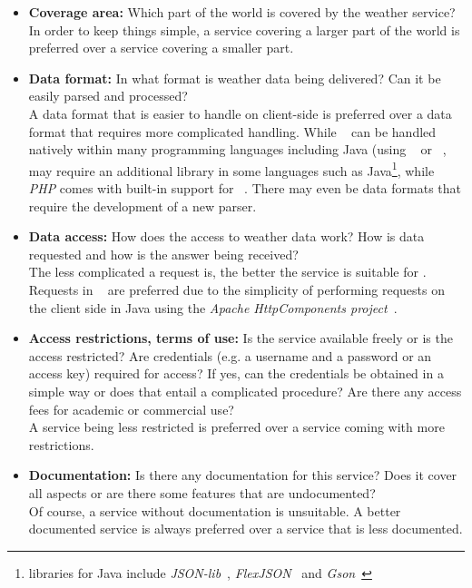 \begin{itemize}
  \item \textbf{Coverage area:} Which part of the world is covered by the weather service?\\
  In order to keep things simple, a service covering a larger part of the world is preferred over a service covering a smaller part.
  
  \item \textbf{Data format:} In what format is weather data being delivered? Can it be easily parsed and processed?\\
  A data format that is easier to handle on client-side is preferred over a data format that requires more complicated handling. While ~\cite{XML} can be handled natively within many programming languages including Java (using ~\cite{DOM} or ~\cite{SAX}, ~\cite{rfc4627} may require an additional library in some languages such as Java\footnote{ libraries for Java include \emph{JSON-lib}~\cite{json-lib}, \emph{FlexJSON}~\cite{flexjson} and \emph{Gson}~\cite{gson}}, while \emph{PHP} comes with built-in support for ~\cite{php-json}. There may even be data formats that require the development of a new parser.
  
  \item \textbf{Data access:} How does the access to weather data work? How is data requested and how is the answer being received?\\
  The less complicated a request is, the better the service is suitable for \smarthomeweather. Requests in ~\cite{rfc2616} are preferred due to the simplicity of performing requests on the client side in Java using the \emph{Apache HttpComponents project}~\cite{apache_hc}.
  
  \item \textbf{Access restrictions, terms of use:} Is the service available freely or is the access restricted? Are credentials (e.g. a username and a password or an access key) required for access? If yes, can the credentials be obtained in a simple way or does that entail a complicated procedure? Are there any access fees for academic or commercial use?\\
  A service being less restricted is preferred over a service coming with more restrictions.
  
  \item \textbf{Documentation:} Is there any documentation for this service? Does it cover all aspects or are there some features that are undocumented?\\
  Of course, a service without documentation is unsuitable. A better documented service is always preferred over a service that is less documented.
  

\end{itemize}
